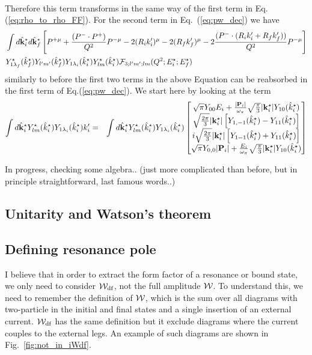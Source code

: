 {\begin{eqnarray}
\end{eqnarray}
Therefore this term transforms in the same way of the first term in Eq.(\ref{eq:rho_to_rho_FF}).
For the second term in Eq.~(\ref{eq:pw_dec}) we have 
\begin{eqnarray}
&\int d\hat{{\bf k}}^\star_id\hat{{\bf k}}^\star_f\left[P^{+\mu}+\frac{(P^{-}\cdot P^{+}) }{Q^2}P^{-\mu}-2(R_ik_i^\prime)^\mu-2(R_fk_f^\prime)^\mu-2\frac{(P^{-}\cdot(R_ik_i^\prime+R_fk_f^\prime))}{Q^2} P^{-\mu}\right]\nonumber\\
& Y^\star_{1\lambda_f}(\hat{k}_f^\star)Y_{l^\prime m^\prime}(\hat{k}_f^\star)  Y_{1\lambda_i}(\hat{k}_i^\star)Y^\star_{lm}(\hat{k}_i^\star) \mathcal{F}_{3;l^\prime m^\prime;l m}(Q^2;E_i^\star;E_f^\star)\label{eq:full_dec}
\end{eqnarray}
similarly to before the first two terms in the above Equation can be reabsorbed in the first term of Eq.(\ref{eq:pw_dec}).
We start here by looking at the term
\begin{eqnarray}
\int d\hat{{\bf k}}^\star_i Y^\star_{l m}(\hat{k}^\star_i)Y_{1\lambda_i}(\hat{k}_i^\star)k_i^\prime&=&\int d\hat{{\bf k}}^\star_i Y^\star_{l m}(\hat{k}^\star_i)Y_{1\lambda_i}(\hat{k}_i^\star)\begin{bmatrix} \sqrt{\pi}Y_{00}E_i + \tfrac{|\textbf{P}_i|}{\omega_\pi}\sqrt{\frac{\pi}{3}}|{\bf k}_i^\star|Y_{10}(\hat{k}^\star_i) \\ \sqrt{\frac{2\pi}{3}}|{\bf k}_i^\star| \left[Y_{1,-1}(\hat{k}_i^\star)-Y_{11}(\hat{k}_i^\star)\right]\\ i\sqrt{\frac{2\pi}{3}}|{\bf k}_i^\star|\left[Y_{1-1}(\hat{k}_i^\star)+Y_{11}(\hat{k}_i^\star)\right] \\ \sqrt{\pi}Y_{0,0}|{\bf P}_i| + \tfrac{E_i}{\omega_\pi} \sqrt{\frac{\pi}{3}}|{\bf k}^\star_i|Y_{10}(\hat{k}_i^\star) \end{bmatrix}
\end{eqnarray}

In progress, checking some algebra.. (just more complicated than before, but in principle straightforward, last famous words..)
}


  \subsection{Unitarity and Watson's theorem}
  


  \subsection{Defining resonance pole}
I believe that in order to extract the form factor of a resonance or bound state, we only need to consider ${\mathcal{W}}_{\rm df}$, not the full amplitude ${\mathcal{W}}$. To understand this, we need to remember the definition of ${\mathcal{W}}$, which is the sum over all diagrams with two-particle in the initial and final states and a single insertion of an external current. ${\mathcal{W}}_{\rm df}$ has the same definition but it exclude diagrams where the current couples to the external legs. An example of such diagrams are shown in Fig.~\ref{fig:not_in_iWdf}. 

